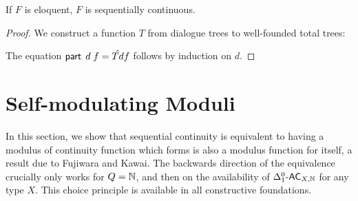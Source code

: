 \documentclass[a4paper,UKenglish,cleveref, autoref, thm-restate]{lipics-v2021}
\begin{document}
\begin{lemma}
  If $F$ is eloquent, $F$ is sequentially continuous.
\end{lemma}
\begin{proof}
  We construct a function $T$ from dialogue trees to well-founded total trees:

  The equation $\eval\;d\;f = \hat{T d} f$ follows by induction on $d$.


\end{proof}

\section{Self-modulating Moduli}

In this section, we show that sequential continuity is equivalent
to having a modulus of continuity function which forms is also a modulus function for itself,
a result due to Fujiwara and Kawai.
The backwards direction of the equivalence crucially only works for $Q = \mathbb{N}$,
and then on the availability of $\Delta^0_1\textsf{-AC}_{X,\mathbb{N}}$ for any type $X$.
This choice principle is available in all constructive foundations.
\end{document}

